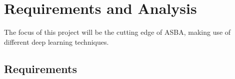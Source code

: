 \documentclass[11pt]{article}
\begin{document}
\newpage
\section{Requirements and Analysis}

The focus of this project will be the cutting edge of ASBA, making use of different deep learning techniques. 

\subsection{Requirements}

        
        
  
\end{document}
